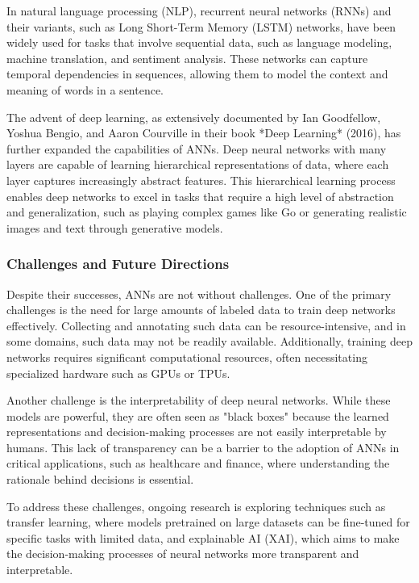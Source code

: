 \documentclass[12pt,twoside]{article}
\begin{document}
In natural language processing (NLP), recurrent neural networks (RNNs) and their variants, such as Long Short-Term Memory (LSTM) networks, have been widely used for tasks that involve sequential data, such as language modeling, machine translation, and sentiment analysis. These networks can capture temporal dependencies in sequences, allowing them to model the context and meaning of words in a sentence.

The advent of deep learning, as extensively documented by Ian Goodfellow, Yoshua Bengio, and Aaron Courville in their book *Deep Learning* (2016), has further expanded the capabilities of ANNs. Deep neural networks with many layers are capable of learning hierarchical representations of data, where each layer captures increasingly abstract features. This hierarchical learning process enables deep networks to excel in tasks that require a high level of abstraction and generalization, such as playing complex games like Go or generating realistic images and text through generative models.

\subsubsection{Challenges and Future Directions}

Despite their successes, ANNs are not without challenges. One of the primary challenges is the need for large amounts of labeled data to train deep networks effectively. Collecting and annotating such data can be resource-intensive, and in some domains, such data may not be readily available. Additionally, training deep networks requires significant computational resources, often necessitating specialized hardware such as GPUs or TPUs.

Another challenge is the interpretability of deep neural networks. While these models are powerful, they are often seen as "black boxes" because the learned representations and decision-making processes are not easily interpretable by humans. This lack of transparency can be a barrier to the adoption of ANNs in critical applications, such as healthcare and finance, where understanding the rationale behind decisions is essential.

To address these challenges, ongoing research is exploring techniques such as transfer learning, where models pretrained on large datasets can be fine-tuned for specific tasks with limited data, and explainable AI (XAI), which aims to make the decision-making processes of neural networks more transparent and interpretable.
\end{document}

